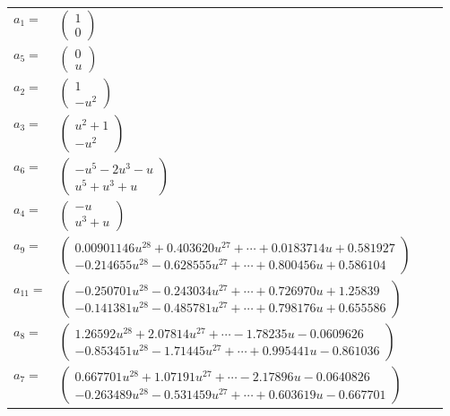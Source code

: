 \documentclass[1p]{elsarticle_modified}
\theoremstyle{definition}
\begin{document}
\begin{tabular}{m{7pt} m{180pt} m{7pt} m{180pt} }
\flushright $a_{1}=$&$\begin{pmatrix}1\\0\end{pmatrix}$ \\
\flushright $a_{5}=$&$\begin{pmatrix}0\\u\end{pmatrix}$ \\
\flushright $a_{2}=$&$\begin{pmatrix}1\\- u^2\end{pmatrix}$ \\
\flushright $a_{3}=$&$\begin{pmatrix}u^2+1\\- u^2\end{pmatrix}$ \\
\flushright $a_{6}=$&$\begin{pmatrix}- u^5-2 u^3- u\\u^5+u^3+u\end{pmatrix}$ \\
\flushright $a_{4}=$&$\begin{pmatrix}- u\\u^3+u\end{pmatrix}$ \\
\flushright $a_{9}=$&$\begin{pmatrix}0.00901146 u^{28}+0.403620 u^{27}+\cdots+0.0183714 u+0.581927\\-0.214655 u^{28}-0.628555 u^{27}+\cdots+0.800456 u+0.586104\end{pmatrix}$ \\
\flushright $a_{11}=$&$\begin{pmatrix}-0.250701 u^{28}-0.243034 u^{27}+\cdots+0.726970 u+1.25839\\-0.141381 u^{28}-0.485781 u^{27}+\cdots+0.798176 u+0.655586\end{pmatrix}$ \\
\flushright $a_{8}=$&$\begin{pmatrix}1.26592 u^{28}+2.07814 u^{27}+\cdots-1.78235 u-0.0609626\\-0.853451 u^{28}-1.71445 u^{27}+\cdots+0.995441 u-0.861036\end{pmatrix}$ \\
\flushright $a_{7}=$&$\begin{pmatrix}0.667701 u^{28}+1.07191 u^{27}+\cdots-2.17896 u-0.0640826\\-0.263489 u^{28}-0.531459 u^{27}+\cdots+0.603619 u-0.667701\end{pmatrix}$ \\

\end{tabular}
\end{document}
